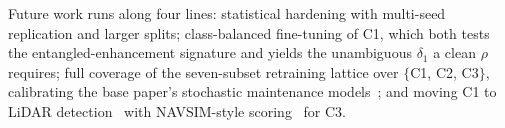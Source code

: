\documentclass[conference]{IEEEtran}
\begin{document}
Future work runs along four lines: statistical hardening with multi-seed
replication and larger splits; class-balanced fine-tuning of C1, which both
tests the entangled-enhancement signature and yields the unambiguous $\delta_1$
a clean $\rho$ requires; full coverage of the seven-subset retraining lattice
over $\{$C1, C2, C3$\}$, calibrating the base paper's stochastic maintenance
models~\cite{wang2024compsac,wang2025issre}; and moving C1 to LiDAR
detection~\cite{yin2021center} with NAVSIM-style
scoring~\cite{dauner2024navsim} for C3.



\end{document}
